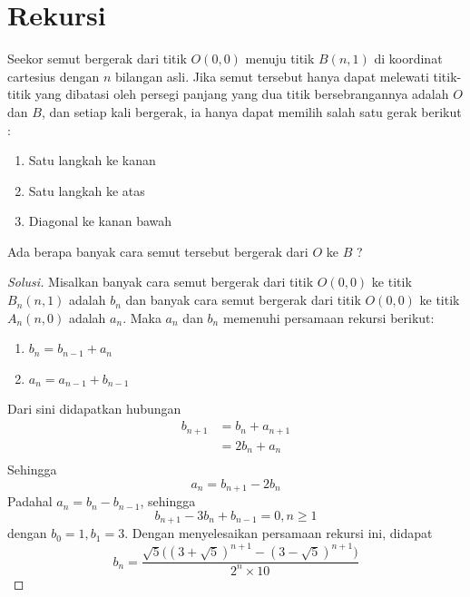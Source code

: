 \documentclass[11pt]{scrartcl}
\begin{document}
\section{Rekursi}
\begin{example}
    Seekor semut bergerak dari titik $O(0,0)$ menuju titik $B(n,1)$ di koordinat cartesius dengan $n$ bilangan asli. Jika semut tersebut hanya dapat melewati titik-titik yang dibatasi oleh persegi panjang yang dua titik bersebrangannya adalah $O$ dan $B$, dan setiap kali bergerak, ia hanya dapat memilih salah satu gerak berikut :
        \begin{enumerate}
            \item Satu langkah ke kanan
            \item Satu langkah ke atas
            \item Diagonal ke kanan bawah
        \end{enumerate}
        Ada berapa banyak cara semut tersebut bergerak dari $O$ ke $B$ ?
\end{example}

\begin{proof}[Solusi]
     Misalkan banyak cara semut bergerak dari titik $O(0,0)$ ke titik $B_n(n,1)$ adalah $b_n$ dan banyak cara semut bergerak dari titik $O(0,0)$ ke titik $A_n(n,0)$ adalah $a_n$. Maka $a_n$ dan $b_n$ memenuhi persamaan rekursi berikut: \\
            \begin{enumerate}
                \item $b_n = b_{n-1} + a_n$
                \item $a_n = a_{n-1} + b_{n-1}$
            \end{enumerate}
        Dari sini didapatkan hubungan 
            \begin{equation*}
                \begin{split}
                    b_{n+1} & = b_n + a_{n+1}\\
                            & = 2b_n + a_n\\  
                \end{split}
            \end{equation*}
        Sehingga $$a_n = b_{n+1} - 2b_n$$
        Padahal $a_n = b_n - b_{n-1}$, sehingga
        $$b_{n+1} - 3b_n + b_{n-1} = 0, n \geq 1$$
        dengan $b_0 = 1, b_1 = 3$. Dengan menyelesaikan persamaan rekursi ini, didapat $$b_n = \dfrac{\sqrt{5}\big((3 + \sqrt{5})^{n+1} - (3 - \sqrt{5})^{n+1}\big)}{2^n \times 10}$$
\end{proof}
\end{document}
